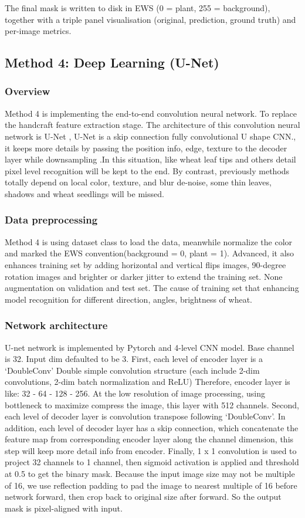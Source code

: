 \documentclass[conference]{IEEEtran}
\begin{document}
The final mask is written to disk in EWS (0 = plant, 255 = background), together with a triple panel visualisation (original, prediction, ground truth) and per-image metrics.


\subsection{Method 4: Deep Learning (U-Net)}
\subsubsection{Overview}
Method 4 is implementing the end-to-end convolution neural network. To replace the handcraft feature extraction stage. The architecture of this convolution neural network is U-Net \cite{unet}, U-Net is a skip connection fully convolutional U shape CNN., it keeps more details by passing the position info, edge, texture to the decoder layer while downsampling .In this situation, like wheat leaf tips and others detail pixel level recognition will be kept to the end. By contrast, previously methods totally depend on local color, texture, and blur de-noise, some thin leaves, shadows and wheat seedlings will be missed.
\subsubsection{Data preprocessing}
Method 4 is using dataset class to load the data, meanwhile normalize the color and marked the EWS convention(background = 0, plant = 1). Advanced, it also enhances training set by adding horizontal and vertical flips images, 90-degree rotation images and brighter or darker jitter to extend the training set. None augmentation on validation and test set. The cause of training set that enhancing model recognition for different direction, angles, brightness of wheat.
\subsubsection{Network architecture}
U-net network is implemented by Pytorch and 4-level CNN model. Base channel is 32. Input dim defaulted to be 3. First, each level of encoder layer is a ‘DoubleConv’ Double simple convolution structure (each include 2-dim convolutions, 2-dim batch normalization and ReLU) Therefore, encoder layer is like: 32 - 64 - 128 - 256. At the low resolution of image processing, using bottleneck to maximize compress the image, this layer with 512 channels. Second, each level of decoder layer is convolution transpose following ‘DoubleConv’. In addition, each level of decoder layer has a skip connection, which concatenate the feature map from corresponding encoder layer along the channel dimension, this step will keep more detail info from encoder. Finally, 1 x 1 convolution is used to project 32 channels to 1 channel, then sigmoid activation is applied and threshold at 0.5 to get the binary mask. Because the input image size may not be multiple of 16, we use reflection padding to pad the image to nearest multiple of 16 before network forward, then crop back to original size after forward. So the output mask is pixel-aligned with input.
\end{document}
